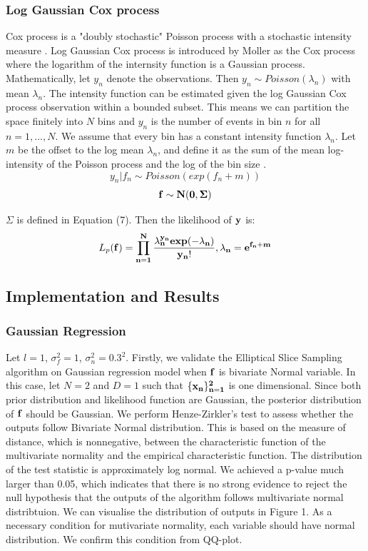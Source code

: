 \documentclass{article}
\begin{document}
\subsubsection{Log Gaussian Cox process}
  Cox process is a "doubly stochastic" Poisson process with a stochastic intensity measure \cite{Moller}. 
  Log Gaussian Cox process is introduced by Moller \cite{Moller} 
  as the Cox process where the logarithm of the internsity function is a Gaussian process. Mathematically, let $y_n$ denote the observations. Then $y_n \sim{Poisson(\lambda_n)}$ with mean $\lambda_n$. The intensity function can be estimated given the log Gaussian Cox process observation within a bounded subset. This means we can partition the space finitely into $N$ bins and $y_n$ is the number of events in bin $n$ for all $n = 1,...,N$. We assume that every bin has a constant intensity function $\lambda_n$. Let $m$ be the offset to the log mean $\lambda_n$, and define it as the sum of the mean log-intensity of the Poisson process and the log of the bin size \cite{MAM}. 
  \begin{equation}
  y_n|f_n \sim{Poisson(exp(f_n + m))}
  \end{equation}
  \begin{equation}
  \bf{f} \sim{N(0,\Sigma)}
  \end{equation}
  
  $\Sigma$ is defined in Equation (7). Then the likelihood of $\bf{y}$ is:
  \begin{equation}
  L_p(\bf{f}) = \prod_{n=1}^{N}\frac{\lambda_{n}^{y_{n}} exp(-\lambda_n)}{y_n!}, \lambda_n = e^{f_n+m}
  \end{equation}
  
\subsection{Implementation and Results}
\subsubsection{Gaussian Regression}

Let $l=1$, $\sigma_{f}^2 = 1$, $\sigma_{n}^2 = 0.3^2$. Firstly, we validate the Elliptical Slice Sampling algorithm on Gaussian regression model when $\bf{f}$ is bivariate Normal variable. In this case, let $N = 2$ and $D = 1$ such that $\{\bf{x}_n\}_{n=1}^{2}$ is one dimensional. Since both prior distribution and likelihood function are Gaussian, the posterior distribution of $\bf{f}$ should be Gaussian. We perform Henze-Zirkler's test to assess whether the outputs follow Bivariate Normal distribution. This is based on the measure of distance, which is nonnegative, between the characteristic function of the multivariate normality and the empirical characteristic function. The distribution of the test statistic is approximately log normal. We achieved a p-value much larger than 0.05, which indicates that there is no strong evidence to reject the null hypothesis that the outputs of the algorithm follows multivariate normal distribtuion. We can visualise the distribution of outputs in Figure 1. As a necessary condition for mutivariate normality, each variable should have normal distribution. We confirm this condition from QQ-plot. 
\end{document}

